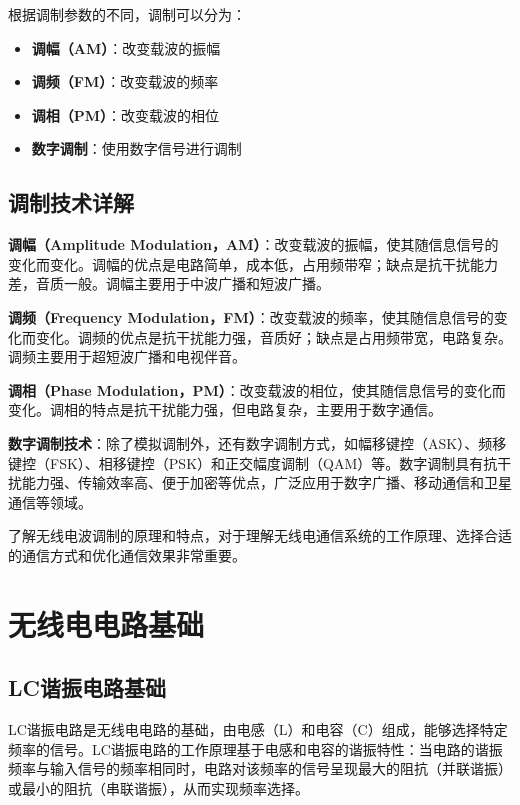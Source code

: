 \documentclass[12pt,UTF8]{ctexbook}
\begin{document}
根据调制参数的不同，调制可以分为：

\begin{itemize}[leftmargin=3.5em]
    \item \textbf{调幅（AM）}：改变载波的振幅
    \item \textbf{调频（FM）}：改变载波的频率
    \item \textbf{调相（PM）}：改变载波的相位
    \item \textbf{数字调制}：使用数字信号进行调制
\end{itemize}

\section{调制技术详解}

\textbf{调幅（Amplitude Modulation，AM）}：改变载波的振幅，使其随信息信号的变化而变化。调幅的优点是电路简单，成本低，占用频带窄；缺点是抗干扰能力差，音质一般。调幅主要用于中波广播和短波广播。

\textbf{调频（Frequency Modulation，FM）}：改变载波的频率，使其随信息信号的变化而变化。调频的优点是抗干扰能力强，音质好；缺点是占用频带宽，电路复杂。调频主要用于超短波广播和电视伴音。

\textbf{调相（Phase Modulation，PM）}：改变载波的相位，使其随信息信号的变化而变化。调相的特点是抗干扰能力强，但电路复杂，主要用于数字通信。

\textbf{数字调制技术}：除了模拟调制外，还有数字调制方式，如幅移键控（ASK）、频移键控（FSK）、相移键控（PSK）和正交幅度调制（QAM）等。数字调制具有抗干扰能力强、传输效率高、便于加密等优点，广泛应用于数字广播、移动通信和卫星通信等领域。

了解无线电波调制的原理和特点，对于理解无线电通信系统的工作原理、选择合适的通信方式和优化通信效果非常重要。

\chapter{无线电电路基础}

\section{LC谐振电路基础}

LC谐振电路是无线电电路的基础，由电感（L）和电容（C）组成，能够选择特定频率的信号。LC谐振电路的工作原理基于电感和电容的谐振特性：当电路的谐振频率与输入信号的频率相同时，电路对该频率的信号呈现最大的阻抗（并联谐振）或最小的阻抗（串联谐振），从而实现频率选择。
\end{document}
